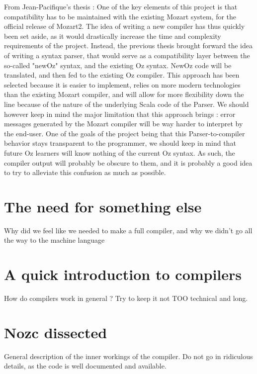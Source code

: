 
From Jean-Pacifique's thesis :
One of the key elements of this project is that compatibility has to be maintained with the existing Mozart system, for the official release of Mozart2.
The idea of writing a new compiler has thus quickly been set aside, as it would drastically increase the time and complexity requirements of the project.
Instead, the previous thesis brought forward the idea of writing a syntax parser, that would serve as a compatibility layer between the so-called "newOz" syntax, and the existing Oz syntax.\cite{jpthesis}
NewOz code will be translated, and then fed to the existing Oz compiler.\newline
This approach has been selected because it is easier to implement, relies on more modern technologies than the existing Mozart compiler, and will allow for more flexibility down the line because of the nature of the underlying Scala code of the Parser.
We should however keep in mind the major limitation that this approach brings : error messages generated by the Mozart compiler will be way harder to interpret by the end-user.
One of the goals of the project being that this Parser-to-compiler behavior stays transparent to the programmer, we should keep in mind that future Oz learners will know nothing of the current Oz syntax.
As such, the compiler output will probably be obscure to them, and it is probably a good idea to try to alleviate this confusion as much as possible.

\section{The need for something else}\label{sec:ch2WhyCompiler}
Why did we feel like we needed to make a full compiler, and why we didn't go all the way to the machine language

\section{A quick introduction to compilers}\label{sec:ch2WhatIsCompiler}
How do compilers work in general ?
Try to keep it not TOO technical and long.

\section{Nozc dissected}\label{sec:ch2HowCompiler}
General description of the inner workings of the compiler.
Do not go in ridiculous details, as the code is well documented and available.

